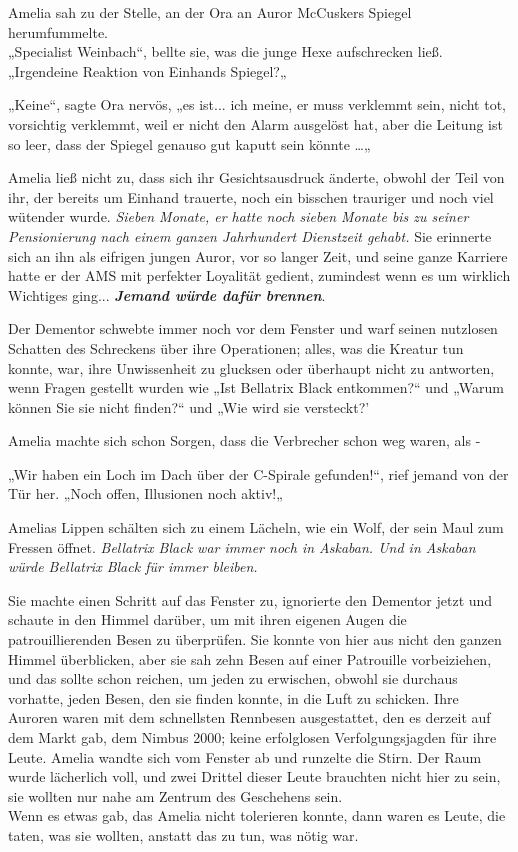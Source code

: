 {Amelia sah zu der Stelle, an der Ora an Auror McCuskers Spiegel herumfummelte.\\ „Specialist Weinbach“, bellte sie, was die junge Hexe aufschrecken ließ.\\ „Irgendeine Reaktion von Einhands Spiegel?„

„Keine“, sagte Ora nervös, „es ist... ich meine, er muss verklemmt sein, nicht tot, vorsichtig verklemmt, weil er nicht den Alarm ausgelöst hat, aber die Leitung ist so leer, dass der Spiegel genauso gut kaputt sein könnte …„

Amelia ließ nicht zu, dass sich ihr Gesichtsausdruck änderte, obwohl der Teil von ihr, der bereits um Einhand trauerte, noch ein bisschen trauriger und noch viel wütender wurde. \emph{Sieben Monate, er hatte noch sieben Monate bis zu seiner Pensionierung nach einem ganzen Jahrhundert Dienstzeit gehabt.} Sie erinnerte sich an ihn als eifrigen jungen Auror, vor so langer Zeit, und seine ganze Karriere hatte er der AMS mit perfekter Loyalität gedient, zumindest wenn es um wirklich Wichtiges ging... \textbf{\emph{Jemand würde dafür brennen}}.

Der Dementor schwebte immer noch vor dem Fenster und warf seinen nutzlosen Schatten des Schreckens über ihre Operationen; alles, was die Kreatur tun konnte, war, ihre Unwissenheit zu glucksen oder überhaupt nicht zu antworten, wenn Fragen gestellt wurden wie „Ist Bellatrix Black entkommen?“ und „Warum können Sie sie nicht finden?“ und „Wie wird sie versteckt?'

Amelia machte sich schon Sorgen, dass die Verbrecher schon weg waren, als -

„Wir haben ein Loch im Dach über der C-Spirale gefunden!“, rief jemand von der Tür her. „Noch offen, Illusionen noch aktiv!„

Amelias Lippen schälten sich zu einem Lächeln, wie ein Wolf, der sein Maul zum Fressen öffnet. \emph{Bellatrix Black war immer noch in Askaban. Und in Askaban würde Bellatrix Black für immer bleiben.}

Sie machte einen Schritt auf das Fenster zu, ignorierte den Dementor jetzt und schaute in den Himmel darüber, um mit ihren eigenen Augen die patrouillierenden Besen zu überprüfen. Sie konnte von hier aus nicht den ganzen Himmel überblicken, aber sie sah zehn Besen auf einer Patrouille vorbeiziehen, und das sollte schon reichen, um jeden zu erwischen, obwohl sie durchaus vorhatte, jeden Besen, den sie finden konnte, in die Luft zu schicken. Ihre Auroren waren mit dem schnellsten Rennbesen ausgestattet, den es derzeit auf dem Markt gab, dem Nimbus 2000; keine erfolglosen Verfolgungsjagden für ihre Leute. Amelia wandte sich vom Fenster ab und runzelte die Stirn. Der Raum wurde lächerlich voll, und zwei Drittel dieser Leute brauchten nicht hier zu sein, sie wollten nur nahe am Zentrum des Geschehens sein.\\ Wenn es etwas gab, das Amelia nicht tolerieren konnte, dann waren es Leute, die taten, was sie wollten, anstatt das zu tun, was nötig war.

}
